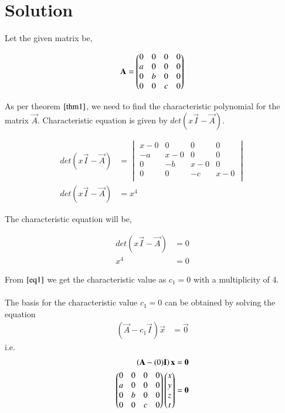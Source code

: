 \documentclass[journal,12pt,twocolumn]{IEEEtran}
\begin{document}
	\section{Solution}
	
	
	Let the given matrix be,
    
    \begin{align}
        \mathbf{A} = \begin{pmatrix}0&0&0&0 \\ a&0&0&0 \\ 0&b&0&0 \\ 0&0&c&0\end{pmatrix}
    \end{align}
	
	As per theorem $\ref{thm1}$, we need to find the characteristic polynomial for the matrix $\Vec{A}$. Characteristic equation is given by $det\left ( x\Vec{I} - \Vec{A}\right)$.
	
	\begin{align}
	    det\left(x\Vec{I} - \Vec{A}\right) &= \begin{vmatrix}
                                                x-0 & 0 & 0 & 0 \\ 
                                                -a & x-0 & 0 & 0 \\
                                                0 & -b & x-0 & 0 \\
                                                0 & 0 & -c & x-0 \\
                                            \end{vmatrix}\\
        det\left(x\Vec{I} - \Vec{A}\right) &= x^{4}
	\end{align}
	
	The characteristic equation will be,
	
	\begin{align}
	    det\left(x\Vec{I} - \Vec{A}\right) &= 0\\
	    x^{4} &= 0 \label{eq1}
	\end{align}
	
	From $\eqref{eq1}$ we get the characteristic value as $c_1 = 0$ with a multiplicity of 4.\\ \\
	The basis for the characteristic value $c_1 = 0$ can be obtained by solving the equation
	\begin{align}
	    \left( \Vec{A} - c_1\Vec{I}\right) \Vec{x} &= \Vec{0}
	\end{align}
	i.e.
	\begin{align}
	    \left( \Vec{A} - (0)\Vec{I}\right) \Vec{x} &= \Vec{0} \\
	    \myvec{0&0&0&0 \\ a&0&0&0 \\ 0&b&0&0 \\ 0&0&c&0}\myvec{x\\y\\z\\t} &= \Vec{0} 
	\end{align}
	
\end{document}
